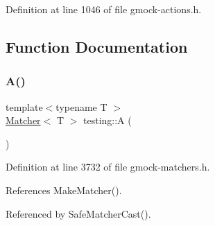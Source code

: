 Definition at line 1046 of file gmock-\/actions.\+h.



\subsection{Function Documentation}
\mbox{\label{namespacetesting_a5e9134d655d2fc9323902348083282e7}} 
\subsubsection{\texorpdfstring{A()}{A()}}
{\footnotesize\ttfamily template$<$typename T $>$ \\
\hyperlink{classtesting_1_1Matcher}{Matcher}$<$ T $>$ testing\+::A (\begin{DoxyParamCaption}{ }\end{DoxyParamCaption})\hspace{0.3cm}{\ttfamily [inline]}}



Definition at line 3732 of file gmock-\/matchers.\+h.



References Make\+Matcher().



Referenced by Safe\+Matcher\+Cast().


